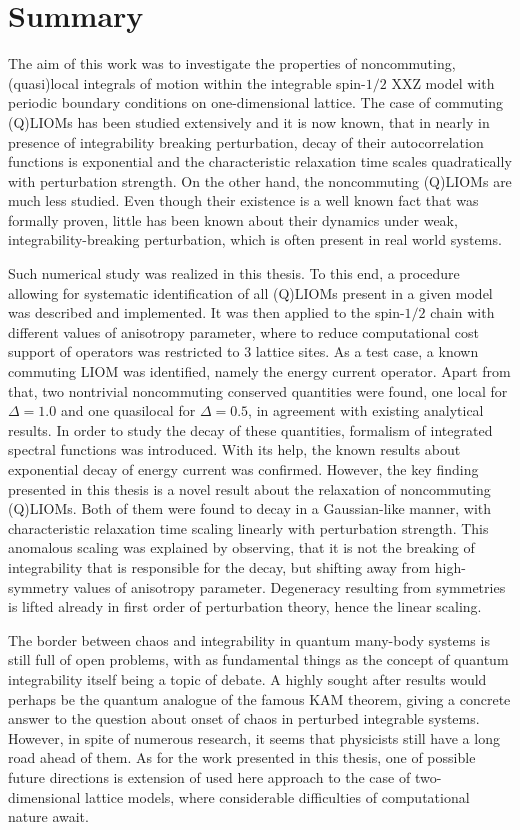 \chapter{Summary}
\thispagestyle{chapterBeginStyle}
The aim of this work was to investigate the properties of noncommuting, (quasi)local integrals of
motion within the integrable spin-\(1/2\) XXZ model with periodic boundary conditions
on one-dimensional lattice. The case of commuting (Q)LIOMs has been studied extensively
and it is now known, that in nearly in presence of integrability breaking perturbation, 
decay of their autocorrelation functions is exponential and the characteristic relaxation
time scales quadratically with perturbation strength. On the other hand, the noncommuting
(Q)LIOMs are much less studied. Even though their existence is a well known fact that was
formally proven,  little has been known about their dynamics under weak, integrability-breaking
perturbation, which is often present in real world systems.

Such numerical study was realized in this thesis. To this end, a procedure allowing for 
systematic identification of all (Q)LIOMs present in a given model was described and implemented.
It was then applied to the spin-\(1/2\) chain with different values of anisotropy parameter,
where to reduce computational cost support of operators was restricted to \(3\) lattice sites.
As a test case, a known commuting LIOM was identified, namely the energy current operator.
Apart from that, two nontrivial noncommuting conserved  quantities were found, one local for
\(\Delta = 1.0\) and one quasilocal for \(\Delta=0.5\), in agreement with existing analytical
results. In order to study the decay of these quantities, formalism of integrated spectral
functions was introduced. With its help, the known results about exponential
decay of energy current was confirmed. However, the key finding presented in this thesis 
is a novel result about the relaxation of noncommuting (Q)LIOMs. Both of them were found
to decay in a Gaussian-like manner, with characteristic relaxation time scaling linearly
with perturbation strength. This anomalous scaling was explained by observing, that
it is not the breaking of integrability that is responsible for the decay, but shifting
away from high-symmetry values of anisotropy parameter. Degeneracy resulting from
symmetries is lifted already in first order of perturbation theory, hence the linear scaling.

The border between chaos and integrability in quantum many-body systems is still full
of open problems, with as fundamental things as the concept of quantum integrability itself
being a topic of debate. A highly sought after results would perhaps be the quantum analogue
of the famous KAM theorem, giving a concrete answer to the question about onset of chaos
in perturbed integrable systems. However, in spite of numerous research, it seems that
physicists still have a long road ahead of them. As for the work presented in this thesis,
one of possible future directions is extension of used here approach to the
case of two-dimensional lattice models, where considerable difficulties of computational
nature await.